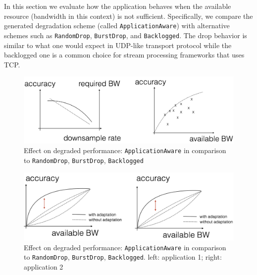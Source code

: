 In this section we evaluate how the application behaves when the available
resource (bandwidth in this context) is not sufficient. Specifically, we compare
the generated degradation scheme (called \texttt{ApplicationAware}) with
alternative schemes such as \texttt{RandomDrop}, \texttt{BurstDrop}, and
\texttt{Backlogged}. The drop behavior is similar to what one would expect in
UDP-like transport protocol while the backlogged one is a common choice for
stream processing frameworks that uses TCP.

\begin{figure}
  \centering
  \includegraphics[width=.95\linewidth]{figures/tradeoff-placeholder.png}
  \caption{Effect on degraded performance: \texttt{ApplicationAware} in
    comparison to \texttt{RandomDrop}, \texttt{BurstDrop}, \texttt{Backlogged}}
  \label{fig:degrade}
\end{figure}

\begin{figure}
  \centering
  \includegraphics[width=.95\linewidth]{figures/degrade-placeholder.png}
  \caption{Effect on degraded performance: \texttt{ApplicationAware} in
    comparison to \texttt{RandomDrop}, \texttt{BurstDrop},
    \texttt{Backlogged}. left: application 1; right: application 2}
  \label{fig:degrade}
\end{figure}

